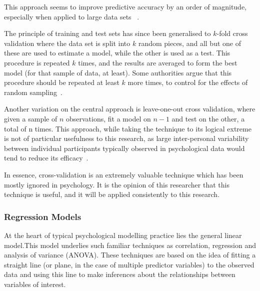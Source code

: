 This approach seems to improve predictive accuracy by an order of  magnitude, especially when applied to large data sets ~\cite{breiman2001statistical}.  

The principle of training and test sets has since been generalised to $k$-fold cross validation where the data set is split into $k$ random pieces, and all but one of these are used to estimate a model, while the other is used as a test. This procedure is repeated $k$ times, and the results are averaged to form the best model (for that sample of data, at least). Some authorities argue that this procedure should be repeated at least $k$ more times, to control for the effects of random sampling~\cite{friedman2009elements}.

Another variation on the central approach is leave-one-out cross validation, where given a sample of $n$ observations, fit a model on $n-1$ and test on the other, a total of n times. This approach, while taking the technique to its logical extreme is not of particular usefulness to this research, as large inter-personal variability between individual participants typically observed in psychological data would tend to reduce its efficacy~\cite{friedman2009elements}. %

In essence, cross-validation is an extremely valuable technique which has been mostly ignored in psychology. It is the opinion of this researcher  that this technique is useful, and it will be applied consistently to this research.

\subsubsection{Regression Models}
\label{sec:regress-models}

At the heart of typical psychological modelling practice lies the general linear model.This model underlies such familiar techniques as correlation, regression and analysis of variance (ANOVA)\cite{gelman2007data}. These techniques are based on the idea of fitting a straight line (or plane, in the case of multiple predictor variables) to the observed data and using this line to make inferences about the relationships between variables of interest.


